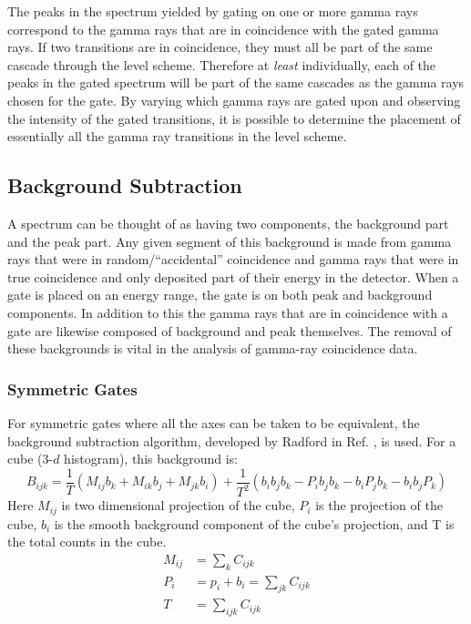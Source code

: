The peaks in the spectrum yielded by gating on one or more gamma rays correspond to the gamma rays that are in coincidence with the gated gamma rays. If two transitions are in coincidence, they must all be part of the same cascade through the level scheme. Therefore at \emph{least} individually, each of the peaks in the gated spectrum will be part of the same cascades as the gamma rays chosen for the gate. By varying which gamma rays are gated upon and observing the intensity of the gated transitions, it is possible to determine the placement of essentially all the gamma ray transitions in the level scheme.

\subsection{Background Subtraction}
\label{ssec:exp-pr-data-proc-bg-sub}
A spectrum can be thought of as having two components, the background part and the peak part. Any given segment of this background is made from gamma rays that were in random/``accidental'' coincidence and gamma rays that were in true coincidence and only deposited part of their energy in the detector. When a gate is placed on an energy range, the gate is on both peak and background components. In addition to this the gamma rays that are in coincidence with a gate are likewise composed of background and peak themselves. The removal of these backgrounds is vital in the analysis of gamma-ray coincidence data.

\subsubsection{Symmetric Gates}
\label{sssec:exp-pr-data-proc-bg-sub-sym}
For symmetric gates where all the axes can be taken to be equivalent, the background subtraction algorithm, developed by Radford in Ref. \cite{symBGSub}, is used. For a cube ($3$-$d$ histogram), this background is:
\begin{equation}
\label{eqn:chp3-cube-bg}
B_{ijk}=\frac{1}{T}\left(M_{ij}b_{k} + M_{ik}b_{j} + M_{jk}b_{i}\right) + \frac{1}{T^{2}}\left(b_{i}b_{j}b_{k} - P_{i}b_{j}b_{k} - b_{i}P_{j}b_{k} - b_{i}b_{j}P_{k}\right)
\end{equation} 
Here $M_{ij}$ is two dimensional projection of the cube, $P_{i}$ is the projection of the cube, $b_{i}$ is the smooth background component of the cube's projection, and T is the total counts in the cube.
\begin{align}
\label{eqn:chp3-cube-bg-defs}
M_{ij} &= \sum\limits_{k}^{}C_{ijk} \\
P_i &= p_i + b_i = \sum\limits_{jk}^{}C_{ijk}\\
T &= \sum\limits_{ijk}^{}C_{ijk}
\end{align}

